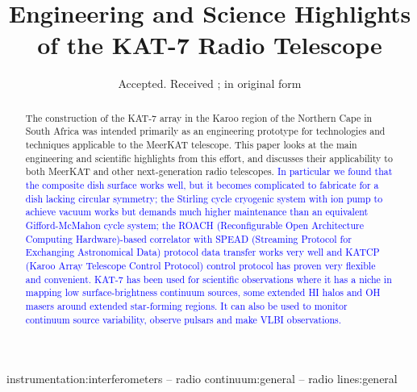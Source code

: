\documentclass[usenatbib,usegraphicx]{mn2e}
\begin{document}


\title[The KAT-7 Radio Telescope] {Engineering and Science Highlights of the KAT-7 Radio Telescope}

\date{Accepted. Received ; in original form }

\pagerange{\pageref{firstpage}--\pageref{lastpage}} 
\label{firstpage}


\maketitle

\begin{abstract}
The construction of the KAT-7 array in the Karoo region of the
Northern Cape in South Africa was intended primarily as an
engineering prototype for technologies and techniques applicable to
the MeerKAT telescope. This paper looks at  the main
engineering and scientific highlights from this effort, and
discusses their applicability to both MeerKAT and other
next-generation radio telescopes. 
\textcolor{blue}{In particular we found that the
composite dish surface works well, but it becomes complicated to
fabricate for a dish lacking circular symmetry; the Stirling cycle
cryogenic system with ion pump to achieve vacuum works but demands
much higher maintenance than an equivalent Gifford-McMahon cycle
system; the ROACH (Reconfigurable Open Architecture Computing 
Hardware)-based correlator with SPEAD (Streaming Protocol for 
Exchanging Astronomical Data) protocol data transfer
works very well and KATCP (Karoo Array Telescope Control Protocol)
control protocol has proven very flexible and 
convenient.
KAT-7 has been used for scientific observations where it
has a niche in mapping
low surface-brightness continuum sources, some extended HI
 halos and OH masers 
around extended star-forming regions. It can also be used to monitor
continuum source variability, observe pulsars and make VLBI observations.}
\end{abstract}

\begin{keywords}
instrumentation:interferometers --  radio continuum:general -- radio lines:general
\end{keywords}



\end{document}
